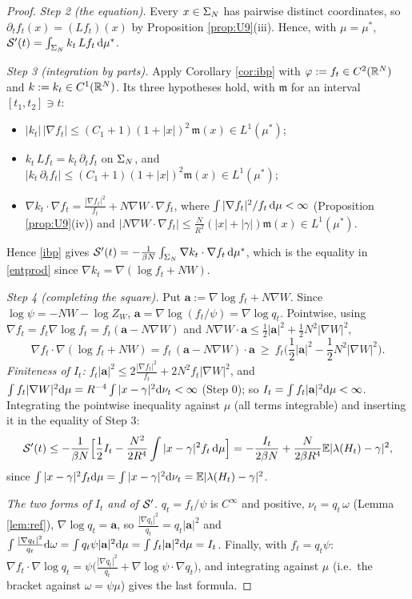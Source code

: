 \begin{proof}
\emph{Step 2 (the equation).} Every $x\in\Sigma_N$ has pairwise distinct coordinates, so $\partial_tf_t(x)=(Lf_t)(x)$ by Proposition \ref{prop:U9}(iii). Hence, with $\mu=\mu^*$,
$\mathcal{S}'(t)=\int_{\Sigma_N}k_t\,Lf_t\,\mathrm{d}\mu^*$.

\emph{Step 3 (integration by parts).} Apply Corollary \ref{cor:ibp} with $\varphi:=f_t\in C^2(\mathbb{R}^N)$ and $k:=k_t\in C^1(\mathbb{R}^N)$. Its three hypotheses hold, with $\mathfrak m$ for an interval $[t_1,t_2]\ni t$:
\begin{itemize}[leftmargin=1.6em,itemsep=1pt]
\item $|k_t|\,|\nabla f_t|\le(C_1+1)(1+|x|)^2\,\mathfrak m(x)\in L^1(\mu^*)$;
\item $k_t\,Lf_t=k_t\,\partial_tf_t$ on $\Sigma_N$, and $|k_t\,\partial_tf_t|\le(C_1+1)(1+|x|)^2\mathfrak m(x)\in L^1(\mu^*)$;
\item $\nabla k_t\cdot\nabla f_t=\frac{|\nabla f_t|^2}{f_t}+N\nabla W\cdot\nabla f_t$, where $\int|\nabla f_t|^2/f_t\,\mathrm{d}\mu<\infty$ (Proposition \ref{prop:U9}(iv)) and $|N\nabla W\cdot\nabla f_t|\le\frac N{R^2}(|x|+|\gamma|)\mathfrak m(x)\in L^1(\mu^*)$.
\end{itemize}
Hence \eqref{ibp} gives $\mathcal{S}'(t)=-\frac1{\beta N}\int_{\Sigma_N}\nabla k_t\cdot\nabla f_t\,\mathrm{d}\mu^*$, which is the equality in \eqref{entprod} since $\nabla k_t=\nabla(\log f_t+NW)$.

\emph{Step 4 (completing the square).} Put $\mathbf a:=\nabla\log f_t+N\nabla W$. Since $\log\psi=-NW-\log Z_W$, $\mathbf a=\nabla\log(f_t/\psi)=\nabla\log q_t$. Pointwise, using $\nabla f_t=f_t\nabla\log f_t=f_t(\mathbf a-N\nabla W)$ and $N\nabla W\cdot\mathbf a\le\frac12|\mathbf a|^2+\frac12N^2|\nabla W|^2$,
\[
\nabla f_t\cdot\nabla(\log f_t+NW)=f_t\,(\mathbf a-N\nabla W)\cdot\mathbf a\ \ge\ f_t\Big(\frac12|\mathbf a|^2-\frac12N^2|\nabla W|^2\Big).
\]
\emph{Finiteness of $I_t$:} $f_t|\mathbf a|^2\le2\frac{|\nabla f_t|^2}{f_t}+2N^2f_t|\nabla W|^2$, and $\int f_t|\nabla W|^2\mathrm{d}\mu=R^{-4}\int|x-\gamma|^2\mathrm{d}\nu_t<\infty$ (Step 0); so $I_t=\int f_t|\mathbf a|^2\mathrm{d}\mu<\infty$.
Integrating the pointwise inequality against $\mu$ (all terms integrable) and inserting it in the equality of Step 3:
\[
\mathcal{S}'(t)\le-\frac1{\beta N}\Big[\frac12I_t-\frac{N^2}{2R^4}\int|x-\gamma|^2f_t\,\mathrm{d}\mu\Big]=-\frac{I_t}{2\beta N}+\frac{N}{2\beta R^4}\mathbb{E}|\lambda(H_t)-\gamma|^2,
\]
since $\int|x-\gamma|^2f_t\mathrm{d}\mu=\int|x-\gamma|^2\mathrm{d}\nu_t=\mathbb{E}|\lambda(H_t)-\gamma|^2$.

\emph{The two forms of $I_t$ and of $\mathcal{S}'$.} $q_t=f_t/\psi$ is $C^\infty$ and positive, $\nu_t=q_t\,\omega$ (Lemma \ref{lem:ref}), $\nabla\log q_t=\mathbf a$, so $\frac{|\nabla q_t|^2}{q_t}=q_t|\mathbf a|^2$ and $\int\frac{|\nabla q_t|^2}{q_t}\mathrm{d}\omega=\int q_t\psi|\mathbf a|^2\mathrm{d}\mu=\int f_t|\mathbf a|^2\mathrm{d}\mu=I_t$.
Finally, with $f_t=q_t\psi$: $\nabla f_t\cdot\nabla\log q_t=\psi\big(\frac{|\nabla q_t|^2}{q_t}+\nabla\log\psi\cdot\nabla q_t\big)$, and integrating against $\mu$ (i.e.\ the bracket against $\omega=\psi\mu$) gives the last formula.
\end{proof}

